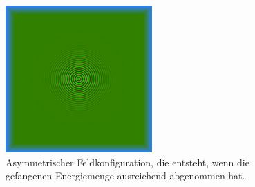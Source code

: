 \begin{figure}
    \begin{center}
        \includegraphics[width=0.5\textwidth]{papers/particles/figures/wavesim/particle_initial_state.png}
        \caption{Asymmetrischer Feldkonfiguration, die entsteht, wenn die gefangenen Energiemenge ausreichend abgenommen hat.\ }\label{particles:fig:partikel:abnehmen:asymmetrisch}
    \end{center}
\end{figure}